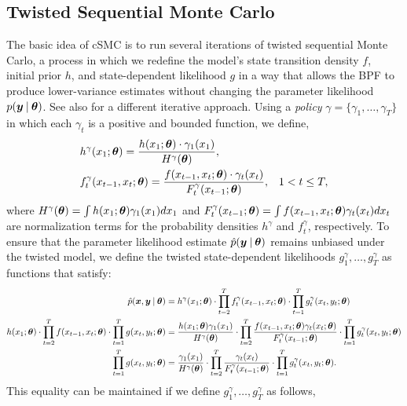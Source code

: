 \documentclass[twoside]{article}
\begin{document}
\subsection{Twisted Sequential Monte Carlo}
The basic idea of cSMC is to run several iterations of twisted sequential Monte Carlo, a process in which we redefine the model's state transition density $f$, initial prior $h$, and state-dependent likelihood $g$ in a way that allows the BPF to produce lower-variance estimates without changing the parameter likelihood $p(\boldsymbol{y} \:\vert\: \boldsymbol{\theta})$. See also \cite{guarniero2017iterated} for a different iterative approach. Using a \emph{policy} $\gamma = \{\gamma_1, \ldots, \gamma_T\}$ in which each $\gamma_t$ is a positive and bounded function, we define,
\begin{align*}
&h^\gamma(x_1; \boldsymbol{\theta}) = \frac{h(x_1; \boldsymbol{\theta}) \cdot \gamma_1(x_1)}{H^\gamma(\boldsymbol{\theta})}, & & \\
&f^\gamma_t(x_{t-1}, x_{t}; \boldsymbol{\theta}) = \frac{f(x_{t-1}, x_t; \boldsymbol{\theta}) \cdot \gamma_t(x_t)}{F^\gamma_t(x_{t-1}; \boldsymbol{\theta})}, & & 1 < t \leq T,
\end{align*}
where $H^\gamma(\boldsymbol{\theta}) = \int h(x_1; \boldsymbol{\theta}) \gamma_1(x_1) dx_1$ and $F^\gamma_t(x_{t-1}; \boldsymbol{\theta}) = \int f(x_{t-1}, x_t; \boldsymbol{\theta})\gamma_t(x_t) dx_t$ are normalization terms for the probability densities $h^\gamma$ and $f^\gamma_t$, respectively.  To ensure that the parameter likelihood estimate $\hat{p}(\boldsymbol{y} \:\vert\: \boldsymbol{\theta})$ remains unbiased under the twisted model, we define the twisted state-dependent likelihoods $g_1^\gamma, \ldots, g_T^\gamma$ as functions that satisfy:
\begin{align*}
\hat{p}(\boldsymbol{x}, \boldsymbol{y} \:\vert\: \boldsymbol{\theta}) &= h^\gamma(x_1; \boldsymbol{\theta}) \cdot \prod_{t=2}^T f^\gamma_t(x_{t-1}, x_t; \boldsymbol{\theta}) \cdot \prod_{t=1}^T g^\gamma_t(x_t, y_t; \boldsymbol{\theta}) \\
h(x_1; \boldsymbol{\theta}) \cdot \prod_{t=2}^T f(x_{t-1}, x_t; \boldsymbol{\theta}) \cdot \prod_{t=1}^T g(x_t, y_t; \boldsymbol{\theta}) &= \frac{h(x_1; \boldsymbol{\theta}) \gamma_1(x_1)}{H^\gamma(\boldsymbol{\theta})} \cdot \prod_{t=2}^T \frac{f(x_{t-1}, x_t; \boldsymbol{\theta})\gamma_t(x_t; \boldsymbol{\theta}) }{F^\gamma_t(x_{t-1}; \boldsymbol{\theta})} \cdot \prod_{t=1}^T g^\gamma_t(x_t, y_t; \boldsymbol{\theta}) \\
\prod_{t=1}^T g(x_t, y_t; \boldsymbol{\theta}) &= \frac{\gamma_1(x_1)}{H^\gamma(\boldsymbol{\theta})} \cdot \prod_{t=2}^T \frac{\gamma_t(x_t) }{F^\gamma_t(x_{t-1}; \boldsymbol{\theta})} \cdot \prod_{t=1}^T g^\gamma_t(x_t, y_t; \boldsymbol{\theta}).
\end{align*}
This equality can be maintained if we define $g^\gamma_1, \ldots, g^\gamma_T$ as follows,
\end{document}
